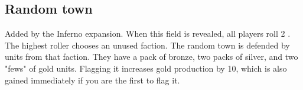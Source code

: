 \subsection*{Random town}
Added by the Inferno expansion.
When this field is revealed, all players roll 2 .
The highest roller chooses an unused faction.
The random town is defended by units from that faction.
They have a pack of bronze, two packs of silver, and two "fews" of gold units.
Flagging it increases gold production by 10, which is also gained immediately if you are the first to flag it.
